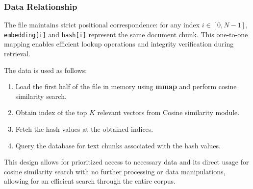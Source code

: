 \subsubsection{Data Relationship}
\label{subsec:Vectordump_DataRelationship}

The file maintains strict positional correspondence: for any index $i \in [0, N-1]$, \texttt{embedding[i]} and \texttt{hash[i]} represent the same document chunk. This one-to-one mapping enables efficient lookup operations and integrity verification during retrieval.

The data is used as follows:
\begin{enumerate}[label=\arabic*.]
\item Load the first half of the file in memory using \textbf{mmap} and perform cosine similarity search.
    \item Obtain index of the top $K$ relevant vectors from Cosine similarity module.
    \item Fetch the hash values at the obtained indices.
    \item Query the database for text chunks associated with the hash values.
\end{enumerate}
    
This design allows for prioritized access to necessary data and its direct usage for cosine similarity search with no further processing or data manipulations, allowing for an efficient search through the entire corpus.




